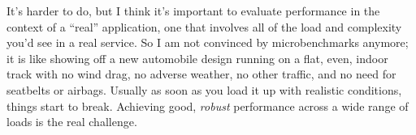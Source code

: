 \documentclass[a4paper,12pt,notitlepage,twoside,openright]{article}
\begin{document}
It's harder to do, but I think it's important to evaluate performance in the context of a ``real'' application, one that involves all of the load and complexity you'd see in a real service. So I am not convinced by microbenchmarks anymore; it is like showing off a new automobile design running on a flat, even, indoor track with no wind drag, no adverse weather, no other traffic, and no need for seatbelts or airbags. Usually as soon as you load it up with realistic conditions, things start to break. Achieving good, \emph{robust} performance across a wide range of loads is the real challenge.
\end{document}
